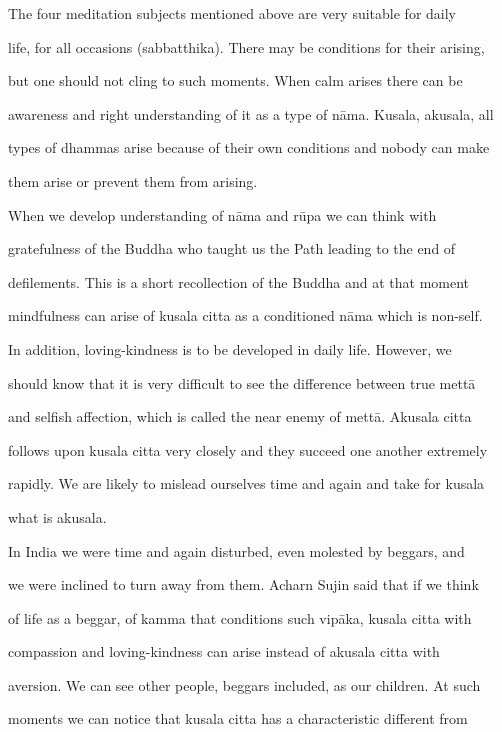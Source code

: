    The  four  meditation  subjects  mentioned  above  are very  suitable  for  daily  

life, for all occasions  (sabbatthika). There may be conditions for their arising,  

but  one  should  not  cling  to  such  moments. When  calm  arises  there  can  be  

awareness and right understanding of it as a type of nāma. Kusala, akusala, all  

types of dhammas arise because of their own conditions and nobody can make  

them arise or prevent them from arising. 

   When   we   develop   understanding   of  nāma   and   rūpa   we   can   think   with  

gratefulness  of  the  Buddha   who   taught  us  the  Path  leading  to  the  end  of  

defilements.  This  is  a  short  recollection  of  the  Buddha  and  at  that  moment  

mindfulness can arise of kusala citta as a conditioned nāma which is non-self. 

   In  addition,  loving-kindness  is  to be  developed  in  daily  life.  However, we  

should know that it is very difficult to  see the difference between true mettā  

and  selfish  affection, which  is  called the  near  enemy  of  mettā. Akusala  citta  

follows upon kusala citta very closely and they succeed one another extremely  

rapidly. We are likely to mislead ourselves time and again and take for kusala  

what is akusala. 

   In India we were time and again disturbed, even molested by beggars, and  

we were inclined to turn away from them. Acharn  Sujin said that if we think  

of  life  as  a beggar,  of kamma that  conditions  such vipāka, kusala  citta with  

compassion   and   loving-kindness   can   arise   instead   of   akusala   citta   with  

aversion. We can see other people, beggars included, as our children. At such  

moments we  can  notice  that  kusala  citta  has  a  characteristic  different  from  

